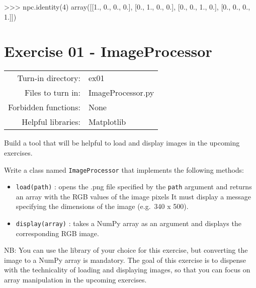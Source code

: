 \documentclass[]{article}
\newenvironment{Shaded}{\begin{snugshade}}{\end{snugshade}}
\newcommand{\DecValTok}[1]{\textcolor[rgb]{0.96,0.45,0.00}{#1}}
\newcommand{\FloatTok}[1]{\textcolor[rgb]{0.96,0.45,0.00}{#1}}
\newcommand{\NormalTok}[1]{\textcolor[rgb]{0.81,0.81,0.76}{#1}}
\newcommand{\OperatorTok}[1]{\textcolor[rgb]{0.81,0.81,0.76}{#1}}
\begin{document}
\begin{Shaded}
\begin{Highlighting}[]
\OperatorTok{>>>}\NormalTok{ npc.identity(}\DecValTok{4}\NormalTok{)}
\NormalTok{array([[}\FloatTok{1.}\NormalTok{, }\FloatTok{0.}\NormalTok{, }\FloatTok{0.}\NormalTok{, }\FloatTok{0.}\NormalTok{],}
\NormalTok{       [}\FloatTok{0.}\NormalTok{, }\FloatTok{1.}\NormalTok{, }\FloatTok{0.}\NormalTok{, }\FloatTok{0.}\NormalTok{],}
\NormalTok{       [}\FloatTok{0.}\NormalTok{, }\FloatTok{0.}\NormalTok{, }\FloatTok{1.}\NormalTok{, }\FloatTok{0.}\NormalTok{],}
\NormalTok{       [}\FloatTok{0.}\NormalTok{, }\FloatTok{0.}\NormalTok{, }\FloatTok{0.}\NormalTok{, }\FloatTok{1.}\NormalTok{]])}
\end{Highlighting}
\end{Shaded}

\clearpage

\hypertarget{exercise-01---imageprocessor-1}{%
\section{Exercise 01 -
ImageProcessor}\label{exercise-01---imageprocessor-1}}

\begin{longtable}[]{@{}rl@{}}
\toprule
\endhead
Turn-in directory: & ex01\tabularnewline
Files to turn in: & ImageProcessor.py\tabularnewline
Forbidden functions: & None\tabularnewline
Helpful libraries: & Matplotlib\tabularnewline
\bottomrule
\end{longtable}

Build a tool that will be helpful to load and display images in the
upcoming exercises.

Write a class named \texttt{ImageProcessor} that implements the
following methods:

\begin{itemize}
\item
  \texttt{load(path)} : opens the .png file specified by the
  \texttt{path} argument and returns an array with the RGB values of the
  image pixels It must display a message specifying the dimensions of
  the image (e.g.~340 x 500).
\item
  \texttt{display(array)} : takes a NumPy array as an argument and
  displays the corresponding RGB image.
\end{itemize}

NB: You can use the library of your choice for this exercise, but
converting the image to a NumPy array is mandatory. The goal of this
exercise is to dispense with the technicality of loading and displaying
images, so that you can focus on array manipulation in the upcoming
exercises.
\end{document}
